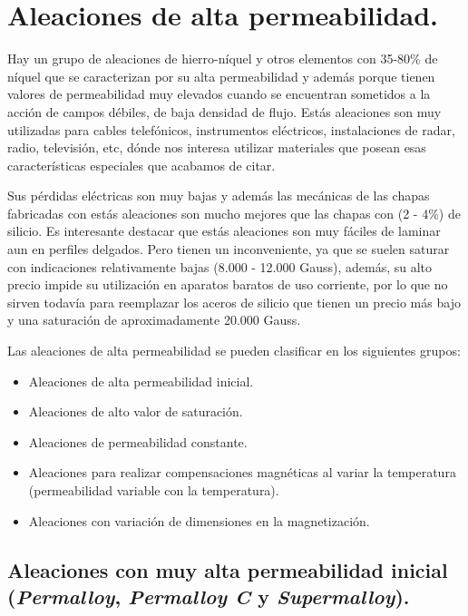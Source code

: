 \documentclass[12pt,a4paper]{article}
\begin{document}
\section{Aleaciones de alta permeabilidad.}

Hay un grupo de aleaciones de hierro-níquel y otros elementos con 35-80\% de níquel que se caracterizan por su alta permeabilidad y además porque tienen valores de permeabilidad muy elevados cuando se encuentran sometidos a la acción de campos débiles, de baja densidad de flujo. Estás aleaciones son muy utilizadas para cables telefónicos, instrumentos eléctricos, instalaciones de radar, radio, televisión, etc, dónde nos interesa utilizar materiales que posean esas características especiales que acabamos de citar.

Sus pérdidas eléctricas son muy bajas y además las mecánicas de las chapas fabricadas con estás aleaciones son mucho mejores que las chapas con (2 - 4\%) de silicio. Es interesante destacar que estás aleaciones son muy fáciles de laminar aun en perfiles delgados. Pero tienen un inconveniente, ya que se suelen saturar con indicaciones relativamente bajas (8.000 - 12.000 Gauss), además, su alto precio impide su utilización en aparatos baratos de uso corriente, por lo que no sirven todavía para reemplazar los aceros de silicio que tienen un precio más bajo y una saturación de aproximadamente 20.000 Gauss.

Las aleaciones de alta permeabilidad se pueden clasificar en los siguientes grupos:

\begin{itemize}
    \item Aleaciones de alta permeabilidad inicial.
    \item Aleaciones de alto valor de saturación.
    \item Aleaciones de permeabilidad constante.
    \item Aleaciones para realizar compensaciones magnéticas al variar la temperatura (permeabilidad variable con la temperatura).
    \item Aleaciones con variación de dimensiones en la magnetización.
\end{itemize}

\subsection{Aleaciones con muy alta permeabilidad inicial (\textit{Permalloy}, \textit{Permalloy C} y \textit{Supermalloy}).}
\end{document}
